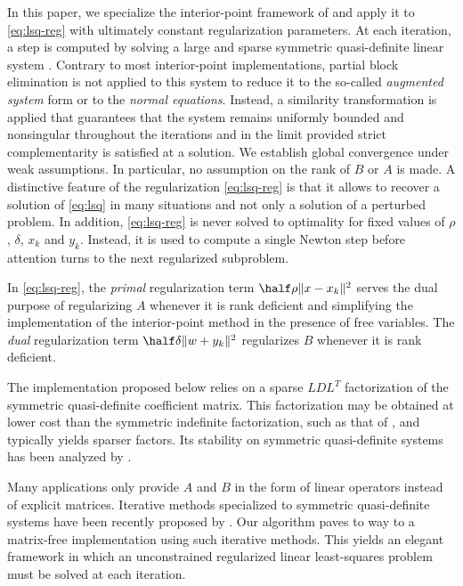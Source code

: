 \documentclass{amsart}
\begin{document}
In this paper, we specialize the interior-point framework of
\cite{friedlander-orban-2012} and apply it to \eqref{eq:lsq-reg} with
ultimately constant regularization parameters. At each iteration, a step is
computed by solving a large and sparse symmetric quasi-definite linear system
\citep{vanderbei-1995}. Contrary to most interior-point implementations,
partial block elimination is not applied to this system to reduce it to the
so-called \textit{augmented system} form or to the \textit{normal equations}.
Instead, a similarity transformation is applied that guarantees that the system
remains uniformly bounded and nonsingular throughout the iterations and in the
limit provided strict complementarity is satisfied at a solution. We establish
global convergence under weak assumptions. In particular, no assumption on the
rank of $B$ or $A$ is made. A distinctive feature of the regularization
\eqref{eq:lsq-reg} is that it allows to recover a solution of \eqref{eq:lsq} in
many situations and not only a solution of a perturbed problem. In addition,
\eqref{eq:lsq-reg} is never solved to optimality for fixed values of $\rho$,
$\delta$, $x_k$ and $y_k$. Instead, it is used to compute a single Newton step
before attention turns to the next regularized subproblem.

In \eqref{eq:lsq-reg}, the \textit{primal} regularization term $\half
\rho \|x - x_k\|^2$ serves the dual purpose of regularizing $A$ whenever it
is rank deficient and simplifying the implementation of the interior-point
method in the presence of free variables. The \textit{dual} regularization term
$\half \delta \|w + y_k\|^2$ regularizes $B$ whenever it is rank
deficient.

The implementation proposed below relies on a sparse $LDL^T$ factorization
of the symmetric quasi-definite coefficient matrix. This factorization may be
obtained at lower cost than the symmetric indefinite factorization, such as
that of \cite{duff-2004}, and typically yields sparser factors. Its stability
on symmetric quasi-definite systems has been analyzed by
\cite{gill-saunders-shinnerl-1996}.

Many applications only provide $A$ and $B$ in the form of linear operators
instead of explicit matrices. Iterative methods specialized to symmetric
quasi-definite systems have been recently proposed by \cite{arioli-orban-2012}.
Our algorithm paves to way to a matrix-free implementation using such iterative
methods. This yields an elegant framework in which an unconstrained
regularized linear least-squares problem must be solved at each iteration.
\end{document}
